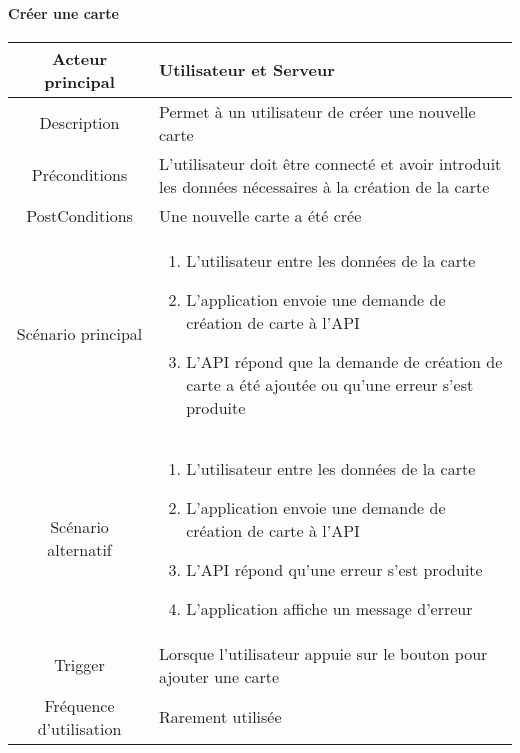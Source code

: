 \documentclass{article}
\begin{document}
    \newpage

\paragraph{Créer une carte}
    \begin{table}[h]
        \begin{tabular}{|c|p{10cm}|}
        \hline
        Acteur principal& Utilisateur et Serveur \\
        \hline
        Description& Permet à un utilisateur de créer une nouvelle carte \\
        \hline
        Préconditions& L'utilisateur doit être connecté et avoir introduit les données nécessaires
            à la création de la carte \\
        \hline
        PostConditions&  Une nouvelle carte a été crée\\
        \hline
        Scénario principal& 
                \begin{enumerate}
                    \item L'utilisateur entre les données de la carte
                    \item L'application envoie une demande de création de carte à l'API
                    \item L'API répond que la demande de création de carte a été ajoutée ou qu'une erreur s'est produite
                \end{enumerate}     \\
        \hline
        Scénario alternatif& 
            \begin{enumerate}
                \item L'utilisateur entre les données de la carte
                \item L'application envoie une demande de création de carte à l'API
                \item L'API répond qu'une erreur s'est produite
                \item L'application affiche un message d'erreur
            \end{enumerate}     \\
        \hline
        Trigger&  Lorsque l'utilisateur appuie sur le bouton pour ajouter une carte   \\
        \hline
        Fréquence d'utilisation& Rarement utilisée  \\
        \hline
        \end{tabular}
    \end{table}
\end{document}

